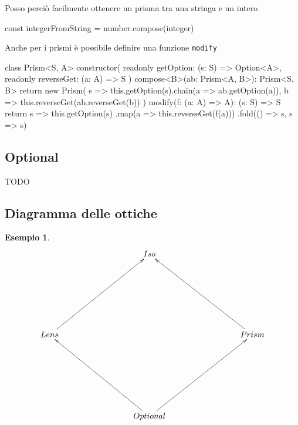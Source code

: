 \documentclass[12pt]{article}
\theoremstyle{definition}
\newtheorem{example}{Esempio}[section]
\newenvironment{code}
  {\vspace{0.5cm} \VerbatimEnvironment\begin{typescriptcode}}
  {\end{typescriptcode} \vspace{0.2cm}}
\begin{document}
Posso perciò facilmente ottenere un prisma tra una stringa e un intero

\begin{code}
const integerFromString = number.compose(integer)
\end{code}

Anche per i prismi è possibile definire una funzione \texttt{modify}

\begin{code}
class Prism<S, A> {
  constructor(
    readonly getOption: (s: S) => Option<A>,
    readonly reverseGet: (a: A) => S
  ) {}
  compose<B>(ab: Prism<A, B>): Prism<S, B> {
    return new Prism(
      s => this.getOption(s).chain(a => ab.getOption(a)),
      b => this.reverseGet(ab.reverseGet(b))
    )
  }
  modify(f: (a: A) => A): (s: S) => S {
    return s =>
      this.getOption(s)
        .map(a => this.reverseGet(f(a)))
        .fold(() => s, s => s)
  }
}
\end{code}

\subsection{Optional}

TODO

\subsection{Diagramma delle ottiche}

\begin{example}
\[
\xymatrixrowsep{3cm}
\xymatrixcolsep{3cm}
\xymatrix{
  & Iso \\
  Lens \ar[ur] & & Prism \ar[ul] \\
  & Optional \ar[ul] \ar[ur] \\
}
\]
\end{example}
\end{document}
